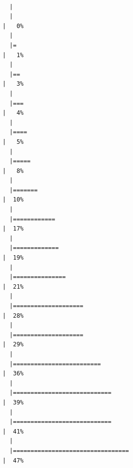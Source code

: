 \documentclass[
  letterpaper,
  DIV=11,
  numbers=noendperiod]{scrartcl}
\begin{document}
\begin{verbatim}

  |                                                                            
  |                                                                      |   0%
  |                                                                            
  |=                                                                     |   1%
  |                                                                            
  |==                                                                    |   3%
  |                                                                            
  |===                                                                   |   4%
  |                                                                            
  |====                                                                  |   5%
  |                                                                            
  |=====                                                                 |   8%
  |                                                                            
  |=======                                                               |  10%
  |                                                                            
  |============                                                          |  17%
  |                                                                            
  |=============                                                         |  19%
  |                                                                            
  |===============                                                       |  21%
  |                                                                            
  |====================                                                  |  28%
  |                                                                            
  |====================                                                  |  29%
  |                                                                            
  |=========================                                             |  36%
  |                                                                            
  |============================                                          |  39%
  |                                                                            
  |============================                                          |  41%
  |                                                                            
  |=================================                                     |  47%

\end{verbatim}
\end{document}
